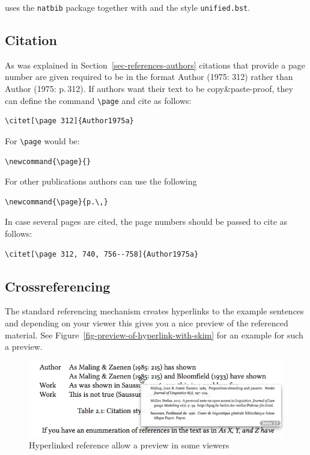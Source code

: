 \lsp uses the \texttt{natbib} package together with \bibtex{} and the \bibtex style \texttt{unified.bst}.


\subsection{Citation}

As was explained in Section~\ref{sec-references-authors} citations that provide a page number are
given required to be in the format Author (1975: 312) rather than Author (1975: p.\,312). If authors
want their text to be copy\&paste-proof, they can define the command \verb+\page+ and cite as
follows:
\begin{verbatim}
\citet[\page 312]{Author1975a}
\end{verbatim}
For \lsp \verb+\page+ would be:
\begin{verbatim}
\newcommand{\page}{}
\end{verbatim}
For other publications authors can use the following
\begin{verbatim}
\newcommand{\page}{p.\,}
\end{verbatim}
In case several pages are cited, the page numbers should be passed to cite as follows:
\begin{verbatim}
\citet[\page 312, 740, 756--758]{Author1975a}
\end{verbatim}


\subsection{Crossreferencing}

The standard referencing mechanism creates hyperlinks to the
example sentences and depending on your viewer this gives you a nice preview of the referenced
material.
See Figure~\vref{fig-preview-of-hyperlink-with-skim} for an example for such a preview.
\begin{figure}[htbp]
\includegraphics[width=\linewidth]{crossref.png}
\caption{\label{fig-preview-of-hyperlink-with-skim}Hyperlinked reference allow a preview in some viewers}
\end{figure}


